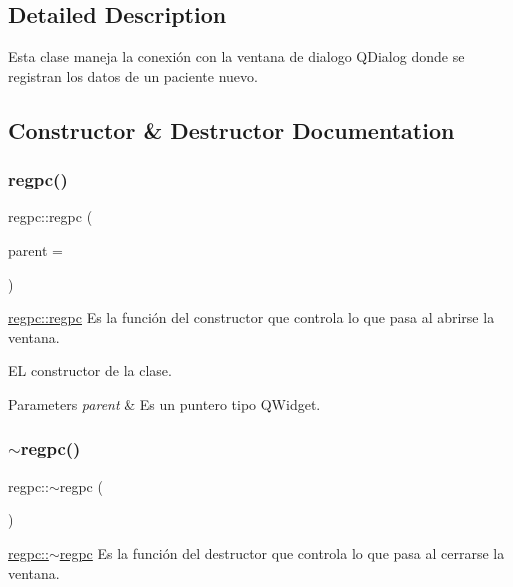 \subsection{Detailed Description}
Esta clase maneja la conexión con la ventana de dialogo Q\+Dialog donde se registran los datos de un paciente nuevo. 

\subsection{Constructor \& Destructor Documentation}
\mbox{\label{classregpc_a0e746dd80042db7863f1acc0eceb3e0e}} 
\subsubsection{\texorpdfstring{regpc()}{regpc()}}
{\footnotesize\ttfamily regpc\+::regpc (\begin{DoxyParamCaption}\item[{Q\+Widget $\ast$}]{parent = {} }\end{DoxyParamCaption})\hspace{0.3cm}{\ttfamily [explicit]}}



\hyperlink{classregpc_a0e746dd80042db7863f1acc0eceb3e0e}{regpc\+::regpc} Es la función del constructor que controla lo que pasa al abrirse la ventana. 

EL constructor de la clase.


\begin{DoxyParams}{Parameters}
{\em parent} & Es un puntero tipo Q\+Widget. \\
\hline
\end{DoxyParams}
\mbox{\label{classregpc_a44345c70fea1c353bde3cd00e4a05c1d}} 
\subsubsection{\texorpdfstring{$\sim$regpc()}{~regpc()}}
{\footnotesize\ttfamily regpc\+::$\sim$regpc (\begin{DoxyParamCaption}{ }\end{DoxyParamCaption})}



\hyperlink{classregpc_a44345c70fea1c353bde3cd00e4a05c1d}{regpc\+::$\sim$regpc} Es la función del destructor que controla lo que pasa al cerrarse la ventana. 

